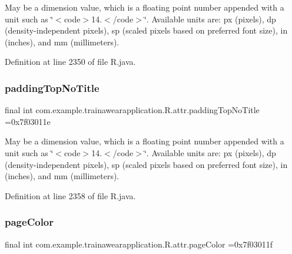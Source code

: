 May be a dimension value, which is a floating point number appended with a unit such as \char`\"{}$<$code$>$14.\+5sp$<$/code$>$\char`\"{}. Available units are\+: px (pixels), dp (density-\/independent pixels), sp (scaled pixels based on preferred font size), in (inches), and mm (millimeters). 

Definition at line 2350 of file R.\+java.

\mbox{\label{classcom_1_1example_1_1trainawearapplication_1_1_r_1_1attr_a4008793c239ca3f1be8b2612b03c291d}} 
\subsubsection{\texorpdfstring{paddingTopNoTitle}{paddingTopNoTitle}}
{\footnotesize\ttfamily final int com.\+example.\+trainawearapplication.\+R.\+attr.\+padding\+Top\+No\+Title =0x7f03011e\hspace{0.3cm}{\ttfamily [static]}}

May be a dimension value, which is a floating point number appended with a unit such as \char`\"{}$<$code$>$14.\+5sp$<$/code$>$\char`\"{}. Available units are\+: px (pixels), dp (density-\/independent pixels), sp (scaled pixels based on preferred font size), in (inches), and mm (millimeters). 

Definition at line 2358 of file R.\+java.

\mbox{\label{classcom_1_1example_1_1trainawearapplication_1_1_r_1_1attr_acae8d8a1bdb4890ba7020c43c5a1bb02}} 
\subsubsection{\texorpdfstring{pageColor}{pageColor}}
{\footnotesize\ttfamily final int com.\+example.\+trainawearapplication.\+R.\+attr.\+page\+Color =0x7f03011f\hspace{0.3cm}{\ttfamily [static]}}

